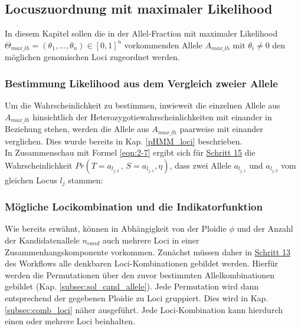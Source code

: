 \subsection{Locuszuordnung mit maximaler Likelihood} \label{subsec:sol_loci_lh}

In diesem Kapitel sollen die in der Allel-Fraction mit maximaler Likelihood $\Theta_{max\_lh} = (\theta_{1},\dots,\theta_{n}) \in [0,1]^n $ vorkommenden Allele $A_{max\_lh}$ mit $\theta_{i} \neq 0$ den möglichen genomischen Loci zugeordnet werden. \\

\subsubsection{Bestimmung Likelihood aus dem Vergleich zweier Allele} \label{sol_lh_al_al}

Um die Wahrscheinlichkeit zu bestimmen, inwieweit die einzelnen Allele aus $A_{max\_lh}$ hinsichtlich der Heterozygotiewahrscheinlichkeiten mit einander in Beziehung stehen, werden die Allele aus $A_{max\_lh}$ paarweise mit einander verglichen. Dies wurde bereits in Kap. \ref{pHMM_loci} beschrieben. \\

In Zusammenschau mit Formel \eqref{eqn:2-7} ergibt sich für \hyperref[step15]{Schritt 15} die Wahrscheinlichkeit $ Pr(T=a_{l_{j,2}} \, , \, S=a_{l_{j,1}}, \eta) $, dass zwei Allele $a_{l_{j,1}}$ und $a_{l_{j,2}}$ vom gleichen Locus $l_{j}$ stammen:
\vspace{-0.5cm}
\begin{center}
\end{center}

\subsubsection{Mögliche Locikombination und die Indikatorfunktion}

Wie bereits erwähnt, können in Abhängigkeit von der Ploidie $ \phi $ und der Anzahl der Kandidatenallele $n_{cand}$ auch mehrere Loci in einer Zusammenhangskomponente vorkommen. Zunächst müssen daher in \hyperref[step13]{Schritt 13\label{step13txt}} des Workflows alle denkbaren Loci-Kombinationen gebildet werden. Hierfür werden die Permutationen über den zuvor bestimmten Allelkombinationen gebildet (Kap. \ref{subsec:sol_cand_allele}). Jede Permutation wird dann entsprechend der gegebenen Ploidie zu Loci gruppiert. Dies wird in Kap. \ref{subsec:comb_loci} näher ausgeführt. Jede Loci-Kombination kann hierdurch einen oder mehrere Loci beinhalten.\\

